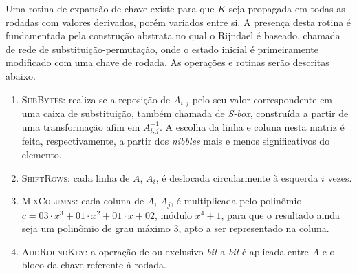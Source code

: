 \documentclass{ufsctex/ufsctex}
\begin{document}
Uma rotina de expansão de chave existe para que $K$ seja propagada em todas as
rodadas com valores derivados, porém variados entre si. A presença desta rotina
é fundamentada pela construção abstrata no qual o Rijndael é baseado, chamada
de rede de substituição-permutação, onde o estado inicial é primeiramente
modificado com uma chave de rodada. As operações e rotinas serão descritas
abaixo.

\begin{enumerate}[label=\roman*.]

  \item \textsc{SubBytes}: realiza-se a reposição de $A_{i, j}$ pelo seu valor
      correspondente em uma caixa de substituição, também chamada de
        \emph{S-box}, construída a partir de uma transformação afim em $A_{i,
        j}^{-1}$.  A escolha da linha e coluna nesta matriz é feita,
        respectivamente, a partir dos \emph{nibbles} mais e menos
        significativos do elemento.

  \item \textsc{ShiftRows}: cada linha de $A$, $A_i$, é deslocada circularmente
      à esquerda $i$ vezes.

  \item \textsc{MixColumns}: cada coluna de $A$, $A_j$, é multiplicada pelo
      polinômio $c = 03 \cdot x^{3} + 01 \cdot x^{2} + 01 \cdot x + 02$, módulo
        $x^{4} + 1$, para que o resultado ainda seja um polinômio de grau
        máximo 3, apto a ser representado na coluna.

  \item \textsc{AddRoundKey}: a operação de ou exclusivo \emph{bit} a
      \emph{bit} é aplicada entre $A$ e o bloco da chave referente à rodada.


\end{enumerate}
\end{document}
